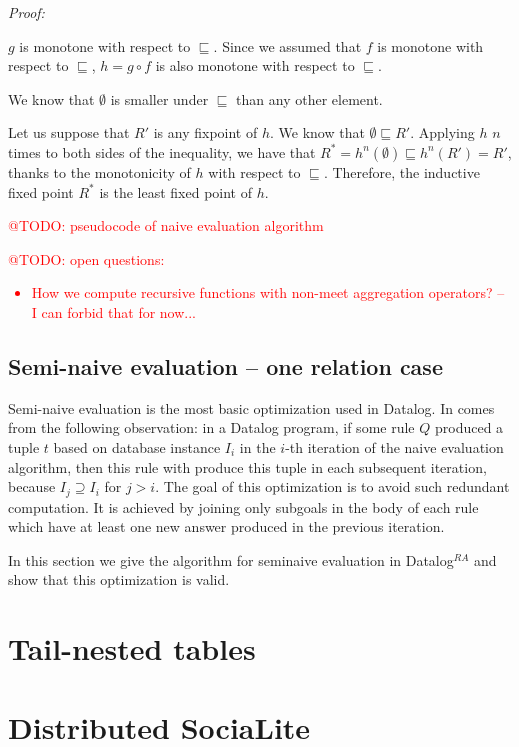 \documentclass{pracamgr}
\makeatletter
\theoremstyle{plain}
\theoremstyle{definition}
\theoremstyle{remark}
\newcommand{\todo}[1]{\textcolor{red}{@TODO: #1}}
\newcommand{\datalogra}{Datalog$^{RA}$ }
\makeatother
\begin{document}
\emph{Proof:} 

$g$ is monotone with respect to $\sqsubseteq$. Since we assumed that $f$ is monotone with respect to $\sqsubseteq$, $h = g \circ f$ is also monotone with respect to $\sqsubseteq$. 

We know that $\emptyset$ is smaller under $\sqsubseteq$ than any other element.

Let us suppose that $R'$ is any fixpoint of $h$.  We know that $\emptyset \sqsubseteq R'$. Applying $h$ $n$ times to both sides of the inequality, we have that $R^* = h^n(\emptyset) \sqsubseteq h^n(R') = R'$, thanks to the monotonicity of $h$ with respect to $\sqsubseteq$. Therefore, the inductive fixed point $R^*$ is the least fixed point of $h$.

\todo{pseudocode of naive evaluation algorithm}

\todo{open questions:
\begin{itemize}
\item How we compute recursive functions with non-meet aggregation operators? -- I can forbid that for now...
\end{itemize}
}

\subsection{Semi-naive evaluation -- one relation case}
Semi-naive evaluation is the most basic optimization used in Datalog. In comes from the following observation: in a Datalog program, if some rule $Q$ produced a tuple $t$ based on database instance $I_i$ in the $i$-th iteration of the naive evaluation algorithm, then this rule with produce this tuple in each subsequent iteration, because $I_j \supseteq I_i$ for $j > i$. The goal of this optimization is to avoid such redundant computation. It is achieved by joining only subgoals in the body of each rule which have at least one new answer produced in the previous iteration.

In this section we give the algorithm for seminaive evaluation in \datalogra and show that this optimization is valid.



\section{Tail-nested tables}\label{s:tnt}

\section{Distributed SociaLite}\label{s:distributed}
\end{document}
